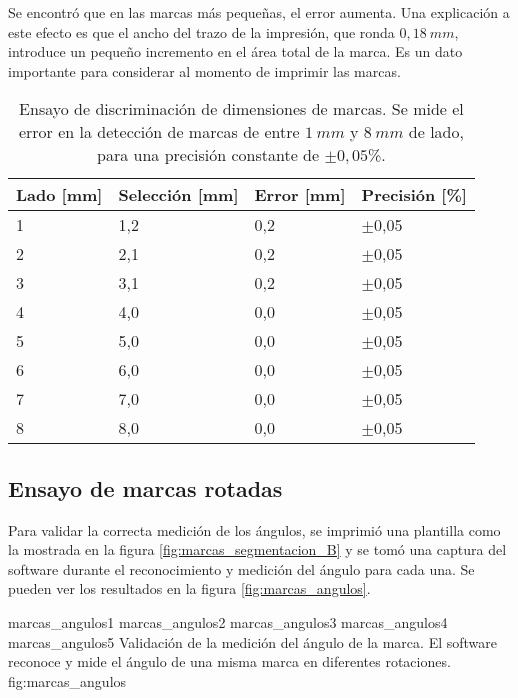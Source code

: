 Se encontró que en las marcas más pequeñas, el error aumenta. Una explicación a este efecto es que el ancho del trazo de la impresión, que ronda $0,18\:mm$, introduce un pequeño incremento en el área total de la marca. Es un dato importante para considerar al momento de imprimir las marcas.

      \begin{table}[!ht]
         \centering
         \caption[Ensayos de discriminación de dimensiones de marcas.]{Ensayo de discriminación de dimensiones de marcas. Se mide el error en la detección de marcas de entre $1\:mm$ y $8\:mm$ de lado, para una precisión constante de $\pm0,05$\%.}
         \begin{tabular}[!ht]{m{1.6cm}m{1.6cm}m{1.6cm}m{1.6cm}}
            \toprule
            \textbf{Lado [mm]} & \textbf{Selección [mm]} & \textbf{Error [mm]}& \textbf{Precisión [\%]}\\
            \midrule
            {1}& {1,2}& {0,2}& {$\pm$0,05}\\
            {2}& {2,1}& {0,2}& {$\pm$0,05}\\
            {3}& {3,1}& {0,2}& {$\pm$0,05}\\
            {4}& {4,0}& {0,0}& {$\pm$0,05}\\
            {5}& {5,0}& {0,0}& {$\pm$0,05}\\
            {6}& {6,0}& {0,0}& {$\pm$0,05}\\
            {7}& {7,0}& {0,0}& {$\pm$0,05}\\
            {8}& {8,0}& {0,0}& {$\pm$0,05}\\
            \bottomrule
         \end{tabular}
         \label{tbl:marcas_dimensiones}
      \end{table}

\subsection{Ensayo de marcas rotadas}

Para validar la correcta medición de los ángulos, se imprimió una plantilla como la mostrada en la figura \ref{fig:marcas_segmentacion_B} y se tomó una captura del software durante el reconocimiento y medición del ángulo para cada una. Se pueden ver los resultados en la figura \ref{fig:marcas_angulos}.

\subfigthreetwo
   {marcas_angulos1}
   {marcas_angulos2}
   {marcas_angulos3}
   {marcas_angulos4}
   {marcas_angulos5}
   {Validación de la medición del ángulo de la marca. El software reconoce y mide el ángulo de una misma marca en diferentes rotaciones.}
   {fig:marcas_angulos}

